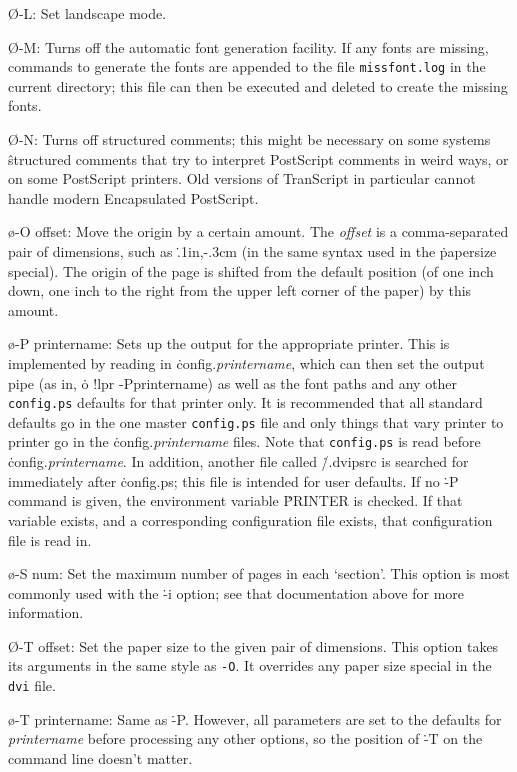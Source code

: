 {%
\O-L:
Set landscape mode.

\O-M:
Turns off the automatic font generation facility.  If any fonts are
missing, commands to generate the fonts are appended to the file
{\tt missfont.log} in the current directory; this file can then be
executed and deleted to create the missing fonts.

\O-N:
Turns off structured comments; this might be necessary on some systems
\^{structured comments}
that try to interpret PostScript comments in weird ways, or on some
PostScript printers.  Old versions of TranScript in particular cannot
handle modern Encapsulated PostScript.

\o-O offset:
Move the origin by a certain amount.  The {\it offset} is a comma-separated
pair of dimensions, such as \.{.1in,-.3cm} (in the same syntax used in
the \.{papersize} special).   The origin of the page is shifted from the
default position (of one inch down, one inch to the right from the upper
left corner of the paper) by this amount.

\o-P printername:
Sets up the output for the appropriate printer.  This is implemented
by reading in \.{config.{\it printername}}, which can then set the output pipe
(as in, \.{o !lpr -Pprintername}) as well as the font paths and any other
\^{{\tt config.ps}}
defaults for that printer only.  It is recommended that all standard
defaults go in the one master {\tt config.ps}
file and only things that vary
printer to printer go in the \.{config.{\it printername}}
files.  Note that {\tt config.ps}
is read before \.{config.{\it printername}}.
In addition, another file called \.{\tilde/.dvipsrc}
is searched for immediately after \.{config.ps};
this file is intended for user defaults.  If no \.{-P} command is
given, the environment variable \.{PRINTER} is checked.  If that
variable exists, and a corresponding configuration
file exists, that configuration file is read in.

\o-S num:
Set the maximum number of pages in each `section'.  This option is most
commonly used with the \.{-i} option; see that documentation above for more
information.

\O-T offset:
Set the paper size to the given pair of dimensions.  This option takes
its arguments in the same style as {\tt -O}.  It overrides any paper
size special in the {\tt dvi} file.

\o-T printername:
Same as \.{-P}.  However, all parameters are set to the defaults for
{\it printername} before processing any other options, so the position
of \.{-T} on the command line doesn't matter.

}
